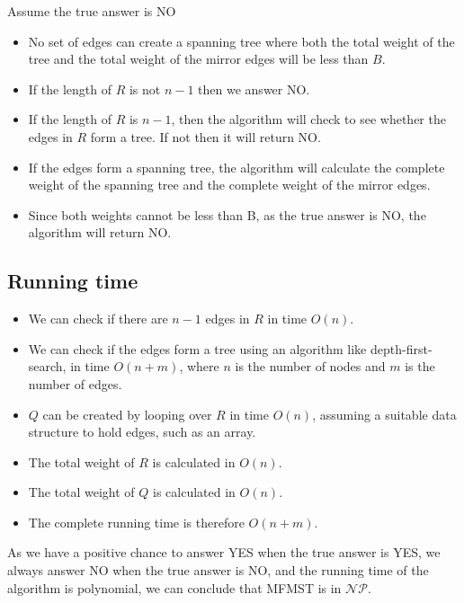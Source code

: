 Assume the true answer is NO

\begin{itemize}
\item No set of edges can create a spanning tree where both the total weight of the tree and the total weight of the mirror edges will be less than $B$.

\item If the length of $R$ is not $n-1$ then we answer NO.

\item If the length of $R$ is $n-1$, then the algorithm will check to see whether the edges in $R$ form a tree. If not then it will return NO.

\item If the edges form a spanning tree, the algorithm will calculate the complete weight of the spanning tree and the complete weight of the mirror edges.

\item Since both weights cannot be less than B, as the true answer is NO, the algorithm will return NO.\\
\end{itemize}


\subsection{Running time}
\begin{itemize}
\item We can check if there are $n-1$ edges in $R$ in time $O(n)$.

\item We can check if the edges form a tree using an algorithm like depth-first-search, in time $O(n+m)$, where $n$ is the number of nodes and $m$ is the number of edges.

\item $Q$ can be created by looping over $R$ in time $O(n)$, assuming a suitable data structure to hold edges, such as an array.

\item The total weight of $R$ is calculated in $O(n)$.

\item The total weight of $Q$ is calculated in $O(n)$.

\item The complete running time is therefore $O(n+m)$.

\end{itemize}

As we have a positive chance to answer YES when the true answer is YES, we always answer NO when the true answer is NO, and the running time of the algorithm is polynomial, we can conclude that MFMST is in $\mathcal{NP}$.